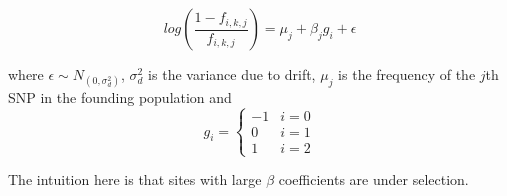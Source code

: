 \documentclass[10pt,a4paper,draft]{article}
\begin{document}
\begin{equation}
log(\frac{1-f_{i,k,j}}{f_{i,k,j}}) = \mu_j + \beta_{j} g_i + \epsilon
\end{equation}

where $\epsilon \sim N_(0, \sigma_d^2)$, $\sigma_d^2$ is the variance due to drift, $\mu_j$ is the frequency of the $j$th SNP in the founding population and 
\[
   g_{i} = \left\{
     \begin{array}{lr}
       -1 &  i =0\\
        0 &  i =1 \\
        1 &  i =2
     \end{array}
   \right.
\]

The intuition here is that sites with large $\beta$ coefficients are under selection.
\end{document}
